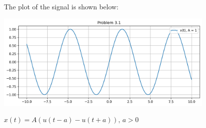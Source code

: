 \documentclass[a4paper, 10pt]{article}
\begin{document}
\begin{solution}
\newpage

The plot of the signal is shown below:
\begin{center}
    \includegraphics[width=0.8\textwidth]{images/problem_3_1.png}
\end{center}
\end{solution}


\begin{subproblems}[start=2]
    \item \( x(t) = A(u(t-a) - u(t+a)), \, a > 0 \)
\end{subproblems}
\end{document}
